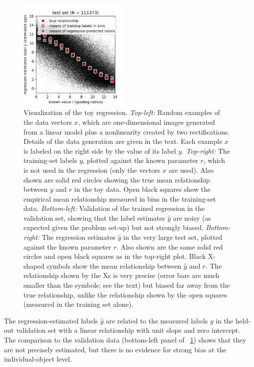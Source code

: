 \documentclass{article}
\newcommand{\figref}[1]{\figurename~\ref{#1}}
\begin{document}
\begin{figure}[p!]
\includegraphics[width=0.49\textwidth]{notebooks/test_data_results.png}
\caption{
Visualization of the toy regression. \textsl{Top-left:} Random examples of the data vectors $x$, which are one-dimensional images generated from a linear model plus a nonlinearity created by two rectifications. Details of the data generation are given in the text. Each example $x$ is labeled on the right side by the value of its label $y$. \textsl{Top-right:} The training-set labels $y$, plotted against the known parameter $r$, which is not used in the regression (only the vectors $x$ are used). Also shown are solid red circles showing the true mean relationship between $y$ and $r$ in the toy data. Open black squares show the empirical mean relationship measured in bins in the training-set data. \textsl{Bottom-left:} Validation of the trained regression in the validation set, showing that the label estimates $\hat{y}$ are noisy (as expected given the problem set-up) but not strongly biased. \textsl{Bottom-right:} The regression estimates $\hat{y}$ in the very large test set, plotted against the known parameter $r$. Also shown are the same solid red circles and open black squares as in the top-right plot. Black X-shaped symbols show the mean relationship between $\hat{y}$ and $r$. The relationship shown by the Xs is very precise (error bars are much smaller than the symbols; see the text) but biased far away from the true relationship, unlike the relationship shown by the open squares (measured in the training set alone).\label{fig:regression}}
\end{figure}

The regression-estimated labels $\hat{y}$ are related to the measured labels $y$ in the held-out validation set with a linear relationship with unit slope and zero intercept.
The comparison to the validation data (bottom-left panel of \figref{fig:regression}) shows that they are not precisely estimated, but there is no evidence for strong bias at the individual-object level.
\end{document}
